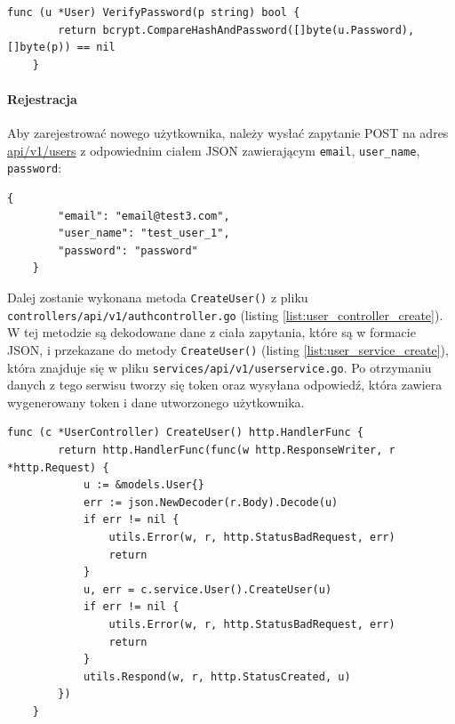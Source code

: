 \begin{lstlisting}[label=list:validate_password,caption=Porównywanie hasła,basicstyle=\tiny\ttfamily]
    func (u *User) VerifyPassword(p string) bool {
        return bcrypt.CompareHashAndPassword([]byte(u.Password), []byte(p)) == nil
    }
\end{lstlisting}

\paragraph{Rejestracja\newline}
Aby zarejestrować nowego użytkownika, należy wysłać zapytanie POST na adres \url{api/v1/users} z odpowiednim ciałem JSON zawierającym \texttt{email}, \texttt{user\_name}, \texttt{password}:
\begin{lstlisting}[basicstyle=\tiny\ttfamily]
    {
        "email": "email@test3.com",
        "user_name": "test_user_1",
        "password": "password"
    }
\end{lstlisting}

Dalej zostanie wykonana metoda \texttt{CreateUser()} z pliku \texttt{controllers/api/v1/authcontroller.go} (listing \ref{list:user_controller_create}).
W tej metodzie są dekodowane dane z ciała zapytania, które są w formacie JSON, i przekazane do metody \texttt{CreateUser()} (listing \ref{list:user_service_create}), która znajduje się w pliku \texttt{services/api/v1/userservice.go}. Po otrzymaniu danych z tego serwisu tworzy się token oraz wysyłana odpowiedź, która zawiera wygenerowany token i dane utworzonego użytkownika.
\begin{lstlisting}[label=list:user_controller_create,caption=Kontroler tworzenia użytkownika,basicstyle=\tiny\ttfamily]
    func (c *UserController) CreateUser() http.HandlerFunc {
        return http.HandlerFunc(func(w http.ResponseWriter, r *http.Request) {
            u := &models.User{}
            err := json.NewDecoder(r.Body).Decode(u)
            if err != nil {
                utils.Error(w, r, http.StatusBadRequest, err)
                return
            }
            u, err = c.service.User().CreateUser(u)
            if err != nil {
                utils.Error(w, r, http.StatusBadRequest, err)
                return
            }
            utils.Respond(w, r, http.StatusCreated, u)
        })
    }
\end{lstlisting}

